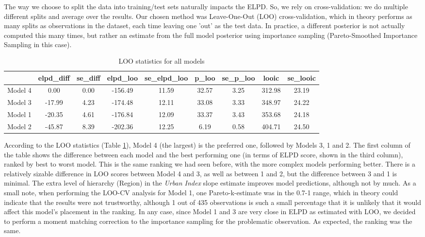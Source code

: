 \documentclass[12pt]{article}
\begin{document}
The way we choose to split the data into training/test sets naturally impacts the ELPD. So, we rely on cross-validation: we do multiple different splits and average over the results. Our chosen method was Leave-One-Out (LOO) cross-validation, which in theory performs as many splits as observations in the dataset, each time leaving one 'out' as the test data. In practice, a different posterior is not actually computed this many times, but rather an estimate from the full model posterior using importance sampling (Pareto-Smoothed Importance Sampling in this case).

\begin{table}[ht]
	\centering
	\begin{tabular}{rcccccccc}
		\hline
		& elpd\_diff & se\_diff & elpd\_loo & se\_elpd\_loo & p\_loo & se\_p\_loo & looic & se\_looic \\ 
		\hline
		Model 4 & 0.00 & 0.00 & -156.49 & 11.59 & 32.57 & 3.25 & 312.98 & 23.19 \\ 
		Model 3 & -17.99 & 4.23 & -174.48 & 12.11 & 33.08 & 3.33 & 348.97 & 24.22 \\ 
		Model 1 & -20.35 & 4.61 & -176.84 & 12.09 & 33.37 & 3.43 & 353.68 & 24.18 \\ 
		Model 2 & -45.87 & 8.39 & -202.36 & 12.25 & 6.19 & 0.58 & 404.71 & 24.50 \\ 
		\hline
	\end{tabular}
	\caption{LOO statistics for all models}
	\label{tab:loo}
\end{table}

According to the LOO statistics (Table \ref{tab:loo}), Model 4 (the largest) is the preferred one, followed by Models 3, 1 and 2. The first column of the table shows the difference between each model and the best performing one (in terms of ELPD score, shown in the third column), ranked by best to worst model.
This is the same ranking we had seen before, with the more complex models performing better. There is a relatively sizable difference in LOO scores between Model 4 and 3, as well as between 1 and 2, but the difference between 3 and 1 is minimal. The extra level of hierarchy (Region) in the \textit{Urban Index} slope estimate improves model predictions, although not by much.
As a small note, when performing the LOO-CV analysis for Model 1, one Pareto-k-estimate was in the 0.7-1 range, which in theory could indicate that the results were not trustworthy, although 1 out of 435 observations is such a small percentage that it is unlikely that it would affect this model's placement in the ranking. In any case, since Model 1 and 3 are very close in ELPD as estimated with LOO, we decided to perform a moment matching correction to the importance sampling for the problematic observation. As expected, the ranking was the same.
\end{document}
